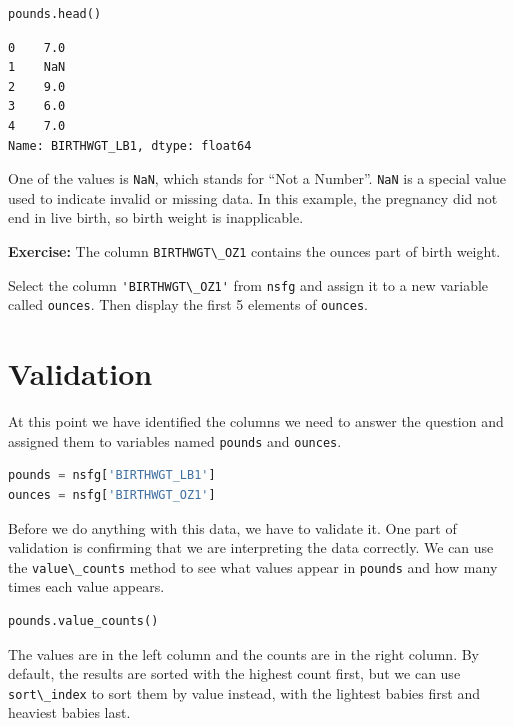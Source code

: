 \begin{lstlisting}[language=Python,style=source]
pounds.head()
\end{lstlisting}

\begin{lstlisting}[style=output]
0    7.0
1    NaN
2    9.0
3    6.0
4    7.0
Name: BIRTHWGT_LB1, dtype: float64
\end{lstlisting}

One of the values is \passthrough{\lstinline!NaN!}, which stands for
``Not a Number''. \passthrough{\lstinline!NaN!} is a special value used
to indicate invalid or missing data. In this example, the pregnancy did
not end in live birth, so birth weight is inapplicable.

\textbf{Exercise:} The column \passthrough{\lstinline!BIRTHWGT\_OZ1!}
contains the ounces part of birth weight.

Select the column \passthrough{\lstinline!'BIRTHWGT\_OZ1'!} from
\passthrough{\lstinline!nsfg!} and assign it to a new variable called
\passthrough{\lstinline!ounces!}. Then display the first 5 elements of
\passthrough{\lstinline!ounces!}.

\hypertarget{validation}{%
\section{Validation}\label{validation}}

At this point we have identified the columns we need to answer the
question and assigned them to variables named
\passthrough{\lstinline!pounds!} and \passthrough{\lstinline!ounces!}.

\begin{lstlisting}[language=Python,style=source]
pounds = nsfg['BIRTHWGT_LB1']
ounces = nsfg['BIRTHWGT_OZ1']
\end{lstlisting}

Before we do anything with this data, we have to validate it. One part
of validation is confirming that we are interpreting the data correctly.
We can use the \passthrough{\lstinline!value\_counts!} method to see
what values appear in \passthrough{\lstinline!pounds!} and how many
times each value appears.

\begin{lstlisting}[language=Python,style=source]
pounds.value_counts()
\end{lstlisting}

The values are in the left column and the counts are in the right
column. By default, the results are sorted with the highest count first,
but we can use \passthrough{\lstinline!sort\_index!} to sort them by
value instead, with the lightest babies first and heaviest babies last.

